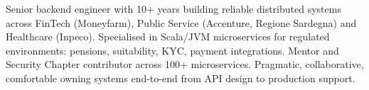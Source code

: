 
\begin{cvskills}

        \cvskill
        {}
        {       Senior backend engineer with 10+ years building reliable distributed systems across FinTech (Moneyfarm), Public Service (Accenture, Regione Sardegna) and Healthcare (Inpeco).
                Specialised in Scala/JVM microservices for regulated environments: pensions, suitability, KYC, payment integrations.
                Mentor and Security Chapter contributor across 100+ microservices. Pragmatic, collaborative, comfortable owning systems end-to-end from API design to production support.
        }

\end{cvskills}

